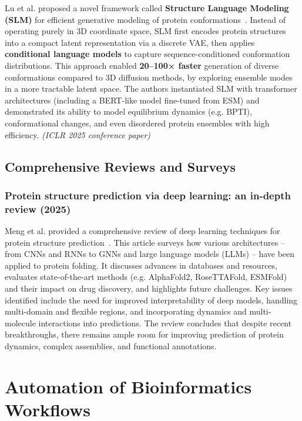 Lu et al.
proposed a novel framework called \textbf{Structure Language Modeling (SLM)} for efficient generative modeling of protein conformations~\cite{Lu2024SLM}.
Instead of operating purely in 3D coordinate space, SLM first encodes protein structures into a compact latent representation via a discrete VAE, then applies \textbf{conditional language models} to capture sequence-conditioned conformation distributions.
This approach enabled \textbf{20–100× faster} generation of diverse conformations compared to 3D diffusion methods, by exploring ensemble modes in a more tractable latent space.
The authors instantiated SLM with transformer architectures (including a BERT-like model fine-tuned from ESM) and demonstrated its ability to model equilibrium dynamics (e.g. BPTI), conformational changes, and even disordered protein ensembles with high efficiency. \textit{(ICLR 2025 conference paper)}

\subsection{Comprehensive Reviews and Surveys}

\subsubsection{Protein structure prediction via deep learning: an in-depth review (2025)}

Meng et al.
provided a comprehensive review of deep learning techniques for protein structure prediction~\cite{Meng2025DeepLearningReview}.
This article surveys how various architectures – from CNNs and RNNs to GNNs and large language models (LLMs) – have been applied to protein folding.
It discusses advances in databases and resources, evaluates state-of-the-art methods (e.g. AlphaFold2, RoseTTAFold, ESMFold) and their impact on drug discovery, and highlights future challenges.
Key issues identified include the need for improved interpretability of deep models, handling multi-domain and flexible regions, and incorporating dynamics and multi-molecule interactions into predictions.
The review concludes that despite recent breakthroughs, there remains ample room for improving prediction of protein dynamics, complex assemblies, and functional annotations.


\section{Automation of Bioinformatics Workflows}

